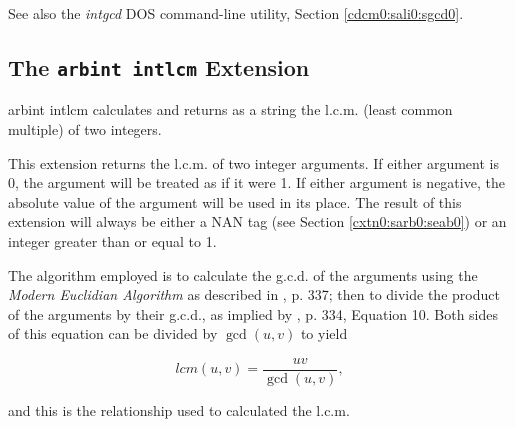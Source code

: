 \begin{tclcommandseealso}
See also the \emph{intgcd} DOS command-line utility, 
Section \ref{cdcm0:sali0:sgcd0}.
\end{tclcommandseealso}


\subsection{The \texttt{arbint intlcm} Extension}
\label{cxtn0:sarb0:slcm0}

\begin{tclcommandname}{arbint intlcm}%
calculates and returns as a string the l.c.m. 
(least common multiple) of two integers.
\end{tclcommandname}

\begin{tclcommandsynopsis}
\end{tclcommandsynopsis}

\begin{tclcommanddescription}
This extension returns the l.c.m. of two integer arguments.
If either argument is 0, the argument will be treated as if it
were 1.  If either
argument is negative, the absolute value of the argument
will be used in its place.  The result of this 
extension will always be either a NAN tag
(see Section \ref{cxtn0:sarb0:seab0}) 
or an integer greater than or equal to 1.

The algorithm employed is to calculate
the g.c.d. of the arguments using the
\emph{Modern Euclidian Algorithm} as
described in \cite{bibref:b:knuthclassic2ndedvol2}, p. 337;
then to divide the product of the arguments by their
g.c.d., as implied by \cite{bibref:b:knuthclassic2ndedvol2},
p. 334, Equation 10.  Both sides of this equation can be
divided by $\gcd(u,v)$ to yield

\begin{equation}
lcm(u,v) = \frac{uv}{\gcd(u,v)},
\end{equation}

and this is the relationship used to calculated the l.c.m.
\end{tclcommanddescription}

